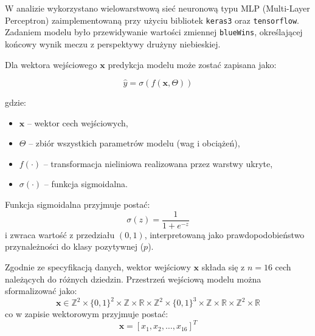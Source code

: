 \documentclass[twoside]{customStyle}
\begin{document}
	W analizie wykorzystano wielowarstwową sieć neuronową typu MLP (Multi-Layer Perceptron) zaimplementowaną przy użyciu bibliotek \texttt{keras3} oraz \texttt{tensorflow}. Zadaniem modelu było przewidywanie wartości zmiennej \texttt{blueWins}, określającej końcowy wynik meczu z perspektywy drużyny niebieskiej.
	
	Dla wektora wejściowego $\mathbf{x}$ predykcja modelu może zostać zapisana jako:
	
	\begin{equation}
		\hat{y} = \sigma(f(\mathbf{x}, \Theta))
	\end{equation}
	
	gdzie:
	\begin{itemize}
		\item $\mathbf{x}$ -- wektor cech wejściowych,
		\item $\Theta$ -- zbiór wszystkich parametrów modelu (wag i obciążeń),
		\item $f(\cdot)$ -- transformacja nieliniowa realizowana przez warstwy ukryte,
		\item $\sigma(\cdot)$ -- funkcja sigmoidalna.
	\end{itemize}
	
	Funkcja sigmoidalna przyjmuje postać:
	\begin{equation}
		\sigma(z) = \frac{1}{1+e^{-z}}
	\end{equation}
	i zwraca wartość z przedziału $(0,1)$, interpretowaną jako prawdopodobieństwo przynależności do klasy pozytywnej ($p$).
	
	Zgodnie ze specyfikacją danych, wektor wejściowy $\mathbf{x}$ składa się z $n=16$ cech należących do różnych dziedzin. Przestrzeń wejściową modelu można sformalizować jako:
	\begin{equation}
		\mathbf{x} \in \mathbb{Z}^2 \times \{0,1\}^2 \times \mathbb{Z} \times \mathbb{R} \times \mathbb{Z}^2 \times \{0,1\}^3 \times \mathbb{Z} \times \mathbb{R} \times \mathbb{Z}^2 \times \mathbb{R}
	\end{equation}
	co w zapisie wektorowym przyjmuje postać:
	\begin{equation}
		\mathbf{x} = [x_1, x_2, \dots, x_{16}]^T
	\end{equation}
	
\end{document}
